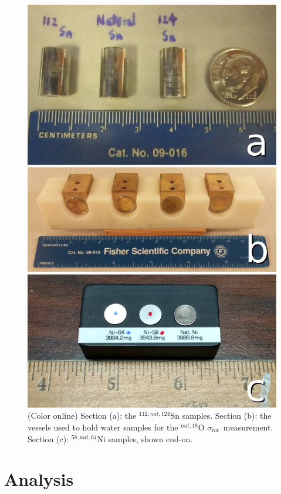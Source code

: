\documentclass[twocolumn,secnumarabic,amssymb, nobibnotes, aps, prl,
superscriptaddress, nobalancelastpage]{revtex4}
\newcommand{\tot}{\ensuremath{\sigma_{tot}}}
\begin{document}
\begin{figure}
    \includegraphics[scale=0.23]{figures/AllIsotopicSamples.jpg}
    \caption{(Color online) Section (a): the ${^{112,nat,124}}$Sn samples. Section (b): the 
        vessels used to hold water samples for the ${^{nat, 18}}$O \tot\  measurement. 
        Section (c): ${^{58,nat,64}}$Ni samples, shown end-on.}
    \label{SamplesImage}
\end{figure}

\section{Analysis}
\end{document}
